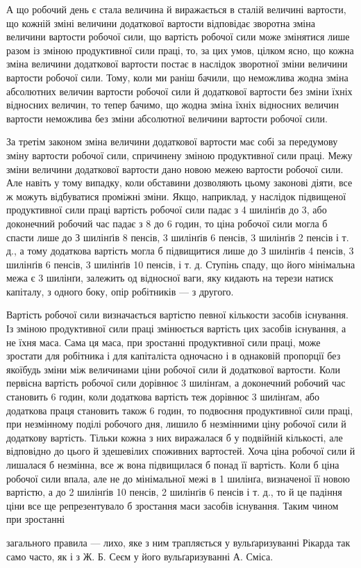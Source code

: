А що робочий день є стала величина й виражається в сталій
величині вартости, що кожній зміні величини додаткової вартости
відповідає зворотна зміна величини вартости робочої сили, що
вартість робочої сили може змінятися лише разом із зміною продуктивної
сили праці, то, за цих умов, цілком ясно, що кожна
зміна величини додаткової вартости постає в наслідок зворотної
зміни величини вартости робочої сили. Тому, коли ми раніш
бачили, що неможлива жодна зміна абсолютних величин вартости
робочої сили й додаткової вартости без зміни їхніх відносних
величин, то тепер бачимо, що жодна зміна їхніх відносних
величин вартости неможлива без зміни абсолютної величини вартости
робочої сили.

За третім законом зміна величини додаткової вартости має
собі за передумову зміну вартости робочої сили, спричинену
зміною продуктивної сили праці. Межу зміни величини додаткової
вартости дано новою межею вартости робочої сили. Але навіть
у тому випадку, коли обставини дозволяють цьому законові
діяти, все ж можуть відбуватися проміжні зміни. Якщо, наприклад,
у наслідок підвищеної продуктивної сили праці вартість
робочої сили падає з 4 шилінґів до 3, або доконечний робочий час
падає з 8 до 6 годин, то ціна робочої сили могла б спасти лише до
З шилінґів 8 пенсів, 3 шилінґів 6 пенсів, 3 шилінґів 2 пенсів
і т. д., а тому додаткова вартість могла б підвищитися лише до
З шилінґів 4 пенсів, 3 шилінґів 6 пенсів, 3 шилінґів 10 пенсів,
і т. д. Ступінь спаду, що його мінімальна межа є 3 шилінґи,
залежить од відносної ваги, яку кидають на терези натиск капіталу,
з одного боку, опір робітників — з другого.

Вартість робочої сили визначається вартістю певної кількости
засобів існування. Із зміною продуктивної сили праці змінюється
вартість цих засобів існування, а не їхня маса. Сама ця
маса, при зростанні продуктивної сили праці, може зростати для
робітника і для капіталіста одночасно і в однаковій пропорції
без якоїбудь зміни між величинами ціни робочої сили й додаткової
вартости. Коли первісна вартість робочої сили дорівнює 3 шилінґам,
а доконечний робочий час становить 6 годин, коли додаткова
вартість теж дорівнює 3 шилінґам, або додаткова праця
становить також 6 годин, то подвоєння продуктивної сили праці,
при незмінному поділі робочого дня, лишило б незмінними ціну
робочої сили й додаткову вартість. Тільки кожна з них виражалася
б у подвійній кількості, але відповідно до цього й здешевілих
споживних вартостей. Хоча ціна робочої сили й лишалася б
незмінна, все ж вона підвищилася б понад її вартість. Коли б
ціна робочої сили впала, але не до мінімальної межі в 1 шилінґа,
визначеної її новою вартістю, а до 2 шилінґів 10 пенсів, 2 шилінґів
6 пенсів і т. д., то й це падіння ціни все ще репрезентувало б
зростання маси засобів існування. Таким чином при зростанні

загального правила — лихо, яке з ним трапляється у вульґаризуванні
Рікарда так само часто, як і з Ж. Б. Сеєм у його вульґаризуванні А. Сміса.
\parbreak{}  %
